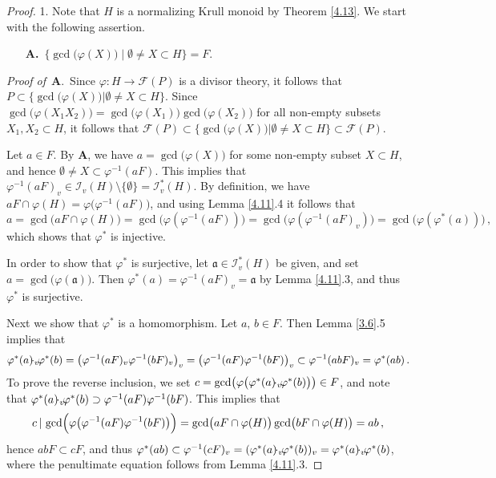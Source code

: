 \documentclass[a4paper]{amsart}
\theoremstyle{definition}
\numberwithin{equation}{section}
\begin{document}
\begin{proof}
1. Note that $H$ is a normalizing Krull monoid by Theorem
\ref{4.13}. We start with the following assertion.

\begin{enumerate}
\item[{\bf A.}\,] $\{ \gcd \big( \varphi (X) \big) \mid \emptyset \ne X
\subset H \} = F$.
\end{enumerate}

{\it Proof of} \,{\bf A}.\, Since $\varphi \colon H \to \mathcal F
(P)$ is a divisor theory, it follows that $P \subset \big\{ \gcd
\big( \varphi (X) \big) \big| \emptyset \ne X \subset H \big\}$.
Since $\gcd \big( \varphi (X_1X_2) \big) = \gcd \big( \varphi (X_1)
\big) \gcd \big( \varphi (X_2) \big)$ for all non-empty subsets
$X_1, X_2 \subset H$, it follows that $\mathcal F (P) \subset \big\{
\gcd \big( \varphi (X) \big) \big| \emptyset \ne X \subset H \big\}
\subset \mathcal F (P)$.

Let $a \in F$. By {\bf A}, we have $a = \gcd \big( \varphi (X)
\big)$ for some non-empty subset $X \subset H$, and hence $\emptyset
\ne X \subset \varphi^{-1} (aF)$. This implies that $\varphi^{-1}
(aF)_v \in \mathcal I_v (H) \setminus \{\emptyset\} = \mathcal I_v^*
(H)$. By definition, we have $aF \cap \varphi (H) = \varphi \big(
\varphi^{-1} (aF) \big)$, and using Lemma \ref{4.11}.4 it follows
that
\[
a = \gcd \big(aF \cap \varphi (H) \big) = \gcd \big( \varphi (
\varphi^{-1}(aF)) \big) = \gcd \big( \varphi ( \varphi^{-1}(aF)_v)
\big) = \gcd \big( \varphi ( \varphi^* (a)) \big) \,,
\]
which shows that $\varphi^*$ is injective.

In order to show that $\varphi^*$ is surjective, let $\mathfrak a
\in \mathcal I_v^* (H)$ be given, and set $a = \gcd \big( \varphi
(\mathfrak a) \big)$. Then $\varphi^* (a) = \varphi^{-1} (aF)_v =
\mathfrak a$ by Lemma \ref{4.11}.3, and thus $\varphi^*$ is
surjective.

Next we  show that $\varphi^*$ is a homomorphism. Let $a,\, b \in
F$. Then Lemma \ref{3.6}.5 implies that
\[
\varphi^*(a) {\negthinspace \cdot_v \negthinspace} \varphi^* (b) = \bigl(
\varphi^{-1}(aF)_v\varphi^{-1} (bF)_v \bigr)_v = \bigl(
\varphi^{-1}(aF)\varphi^{-1} (bF) \bigr)_v \subset
\varphi^{-1}(abF)_v = \varphi^*(ab)\,.
\]
To prove the reverse inclusion, we set $c = \gcd \bigl ( \varphi
\bigl(\varphi^* (a){\negthinspace \cdot_v \negthinspace} \varphi^*(b) \bigr)\bigr) \in F$, and note
that $\varphi^* (a) {\negthinspace \cdot_v \negthinspace} \varphi^* (b) \supset \varphi^{-1}(aF)
\varphi^{-1}(bF)$. This implies that
\[
c {\, | \,} \gcd \Bigl( \varphi \bigl( \varphi^{-1}(aF) \varphi^{-1}(bF)
\bigr) \Bigr) = \gcd \bigl(aF \cap \varphi(H)\bigr) \gcd \bigl(bF
\cap \varphi(H) \bigr) = ab\,,
\]
hence $abF \subset cF$, and  thus $\varphi^* (ab) \subset
\varphi^{-1}(cF)_v = ( \varphi^*(a) {\negthinspace \cdot_v \negthinspace} \varphi^*(b))_v =
\varphi^*(a) {\negthinspace \cdot_v \negthinspace} \varphi^*(b)$, where the penultimate equation
follows from Lemma \ref{4.11}.3.


\end{proof}
\end{document}
